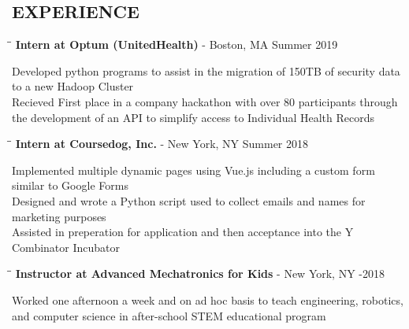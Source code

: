 \documentclass{res}
\begin{document}
\begin{resume}
\section{EXPERIENCE}
   \vspace{-0.1in}	
   \begin{tabbing}
   \hspace{2.3in}\= \hspace{3.8in}\= \kill
    {\bf Intern at Optum (UnitedHealth)} - Boston, MA   \>  \>Summer 2019
   \end{tabbing}\vspace{-20pt}  
    Developed python programs to assist in the migration of 150TB of security data to a new Hadoop Cluster\\
    Recieved First place in a company hackathon with over 80 participants through the development of an API to simplify access to 		Individual Health Records
    \vspace{-15pt} 
   \begin{tabbing}
   \hspace{2.3in}\= \hspace{3.8in}\= \kill
    {\bf Intern at Coursedog, Inc.} - New York, NY   \>  \>Summer 2018
   \end{tabbing}\vspace{-20pt} 
    Implemented multiple dynamic pages using Vue.js including a custom form similar to Google Forms\\
    Designed and wrote a Python script used to collect emails and names for marketing purposes\\          
    Assisted in preperation for application and then acceptance into the Y Combinator Incubator
   \vspace{-15pt} 
   \begin{tabbing}
   \hspace{2.3in}\= \hspace{4in}\= \kill      
   {\bf Instructor at Advanced Mechatronics for Kids} - New York, NY   \>  -2018
   \end{tabbing}\vspace{-20pt}
    Worked one afternoon a week and on ad hoc basis to teach engineering, robotics, and computer
	science in after-school STEM educational program          





\end{resume}
\end{document}
